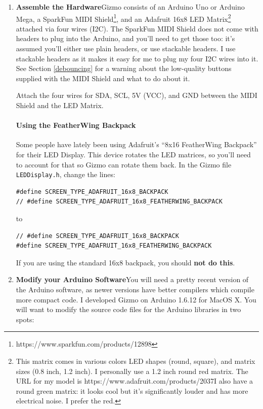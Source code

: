 \documentclass{article}
\begin{document}
\begin{enumerate}

\item {\bf Assemble the Hardware}\quad Gizmo consists of an Arduino Uno or Arduino Mega, a SparkFun MIDI Shield\footnote{https:/\!/www.sparkfun.com/products/12898}, and an Adafruit 16x8 LED Matrix\footnote{This matrix comes in various colors LED shapes (round, square), and matrix sizes (0.8 inch, 1.2 inch).  I personally use a 1.2 inch round red matrix.  The URL for my model is https:/\!/www.adafruit.com/products/2037\quad I also have a round green matrix: it looks cool but it's significantly louder and has more electrical noise.  I prefer the red.} attached via four wires (I2C).  The SparkFun MIDI Shield does not come with headers to plug into the Arduino, and you'll need to get those too: it's assumed you'll either use plain headers, or use stackable headers.  I use stackable headers as it makes it easy for me to plug my four I2C wires into it.  See Section \ref{debouncing} for a warning about the low-quality buttons supplied with the MIDI Shield and what to do about it.

Attach the four wires for SDA, SCL, 5V (VCC), and GND between the MIDI Shield and the LED Matrix.  

\paragraph{Using the FeatherWing Backpack} Some people have lately been using Adafruit's ``8x16 FeatherWing Backpack'' for their LED Display.  This device rotates the LED matrices, so you'll need to account for that so Gizmo can rotate them back.  In the Gizmo file \texttt{LEDDisplay.h}, change the lines:

\begin{verbatim}
#define SCREEN_TYPE_ADAFRUIT_16x8_BACKPACK
// #define SCREEN_TYPE_ADAFRUIT_16x8_FEATHERWING_BACKPACK
\end{verbatim}

to

\begin{verbatim}
// #define SCREEN_TYPE_ADAFRUIT_16x8_BACKPACK
#define SCREEN_TYPE_ADAFRUIT_16x8_FEATHERWING_BACKPACK
\end{verbatim}

If you are using the standard 16x8 backpack, you should {\bf not do this}.


\item {\bf Modify your Arduino Software}\quad You will need a pretty recent version of the Arduino software, as newer versions have better compilers which compile more compact code.  I developed Gizmo on Arduino 1.6.12 for MacOS X.  You will want to modify the source code files for the Arduino libraries in two spots:


\end{enumerate}
\end{document}
